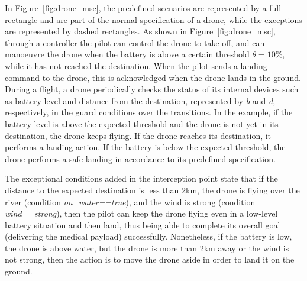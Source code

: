 
In Figure~\ref{fig:drone_msc}, the predefined scenarios are represented by a full rectangle and are part of the normal specification of a drone, while the exceptions are represented by dashed rectangles. As shown in Figure~\ref{fig:drone_msc}, through a controller the pilot can control the drone to take off, and can manoeuvre the drone when the battery is above a certain threshold $\theta = 10\%$, while it has not reached the destination. When the pilot sends a landing command to the drone, this is acknowledged when the drone lands in the ground.  During a flight, a drone periodically checks the status of its internal devices such as battery level and distance from the destination, represented by \textit{b} and \textit{d}, respectively, in the guard conditions over the transitions. In the example, if the battery level is above the expected threshold and the drone is not yet in its destination, the drone keeps flying. If the drone reaches its destination, it performs a landing action. If the battery is below the expected threshold, the drone performs a safe landing in accordance to its predefined specification. 

The exceptional conditions added in the interception point state that if the distance to the expected destination is less than 2km, the drone is flying over the river (condition \textit{on\_water==true}), and the wind is strong (condition \textit{wind==strong}), then the pilot can keep the drone flying even in a low-level battery situation and then land, thus being able to complete its overall goal (delivering the medical payload) successfully. Nonetheless, if the battery is low, the drone is above water, but the drone is more than 2km away or the wind is not strong,
then the action is to move the drone aside in order to land it on the ground. 


